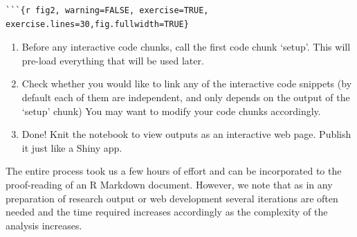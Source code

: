 \begin{verbatim}
```{r fig2, warning=FALSE, exercise=TRUE, exercise.lines=30,fig.fullwidth=TRUE}
\end{verbatim}

\begin{enumerate}
\def\labelenumi{\arabic{enumi}.}
\setcounter{enumi}{3}
\tightlist
\item
  Before any interactive code chunks, call the first code chunk `setup'.
  This will pre-load everything that will be used later.
\item
  Check whether you would like to link any of the interactive code
  snippets (by default each of them are independent, and only depends on
  the output of the `setup' chunk) You may want to modify your code
  chunks accordingly.
\item
  Done! Knit the notebook to view outputs as an interactive web page.
  Publish it just like a Shiny app.
\end{enumerate}

The entire process took us a few hours of effort and can be incorporated
to the proof-reading of an R Markdown document. However, we note that as
in any preparation of research output or web development several
iterations are often needed and the time required increases accordingly
as the complexity of the analysis increases.

